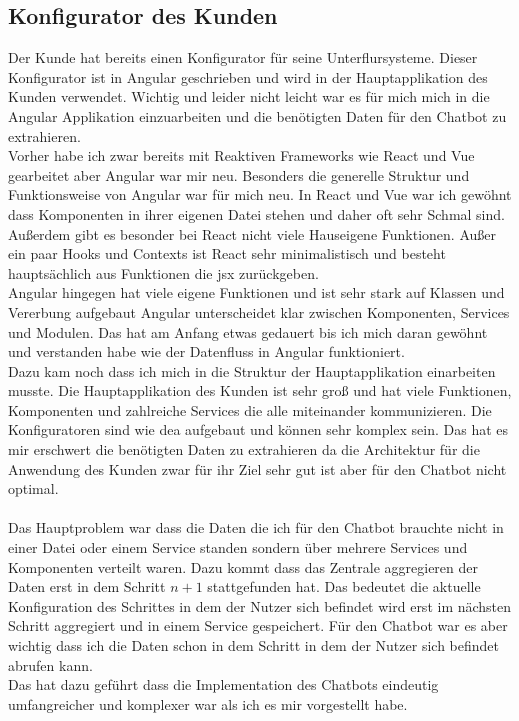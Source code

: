 \subsection{Konfigurator des Kunden}\label{sec:umsetzung_konfigurator}
Der Kunde hat bereits einen Konfigurator für seine Unterflursysteme. Dieser Konfigurator ist in Angular geschrieben und wird in der Hauptapplikation des Kunden verwendet.
Wichtig und leider nicht leicht war es für mich mich in die Angular Applikation einzuarbeiten und die benötigten Daten für den Chatbot zu extrahieren.\\
Vorher habe ich zwar bereits mit Reaktiven Frameworks wie React und Vue gearbeitet aber Angular war mir neu. Besonders die generelle Struktur und Funktionsweise von Angular war für mich neu.
In React und Vue war ich gewöhnt dass Komponenten in ihrer eigenen Datei stehen und daher oft sehr Schmal sind. Außerdem gibt es besonder bei React nicht viele
Hauseigene Funktionen. Außer ein paar Hooks und Contexts ist React sehr minimalistisch und besteht hauptsächlich aus Funktionen die \gls{jsx} zurückgeben.\\
Angular hingegen hat viele eigene Funktionen und ist sehr stark auf Klassen und Vererbung aufgebaut Angular unterscheidet klar zwischen Komponenten, Services und Modulen.
Das hat am Anfang etwas gedauert bis ich mich daran gewöhnt und verstanden habe wie der Datenfluss in Angular funktioniert.\\
Dazu kam noch dass ich mich in die Struktur der Hauptapplikation einarbeiten musste. Die Hauptapplikation des Kunden ist sehr groß und hat viele Funktionen, Komponenten und zahlreiche
Services die alle miteinander kommunizieren. Die Konfiguratoren sind wie \gls{dea} aufgebaut und können sehr komplex sein. Das hat es mir erschwert die benötigten Daten zu extrahieren
da die Architektur für die Anwendung des Kunden zwar für ihr Ziel sehr gut ist aber für den Chatbot nicht optimal.\\\\
Das Hauptproblem war dass die Daten die ich für den Chatbot brauchte nicht in einer Datei oder einem Service standen sondern über mehrere Services und Komponenten verteilt waren.
Dazu kommt dass das Zentrale aggregieren der Daten erst in dem Schritt $n+1$ stattgefunden hat.
Das bedeutet die aktuelle Konfiguration des Schrittes in dem der Nutzer sich befindet wird erst im nächsten Schritt aggregiert und in einem Service gespeichert.
Für den Chatbot war es aber wichtig dass ich die Daten schon in dem Schritt in dem der Nutzer sich befindet abrufen kann.\\
Das hat dazu geführt dass die Implementation des Chatbots eindeutig umfangreicher und komplexer war als ich es mir vorgestellt habe.

